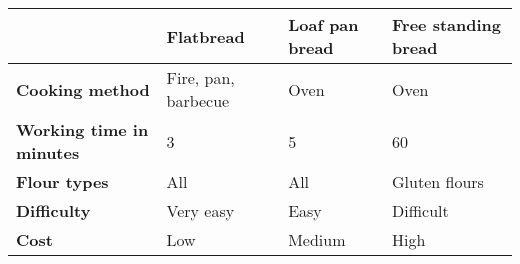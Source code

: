 


\begin{tabular}{llll}
\toprule
                                 & \textbf{Flatbread}  & \textbf{Loaf pan bread} & \textbf{Free standing bread} \\ \midrule
\textbf{Cooking method}          & Fire, pan, barbecue & Oven                    & Oven                         \\ \midrule
\textbf{Working time in minutes} & 3                   & 5                       & 60                           \\ \midrule
\textbf{Flour types}             & All                 & All                     & Gluten flours                \\ \midrule
\textbf{Difficulty}              & Very easy           & Easy                    & Difficult                    \\ \midrule
\textbf{Cost}                    & Low                 & Medium
                                 & High                         \\ \bottomrule
\end{tabular}

